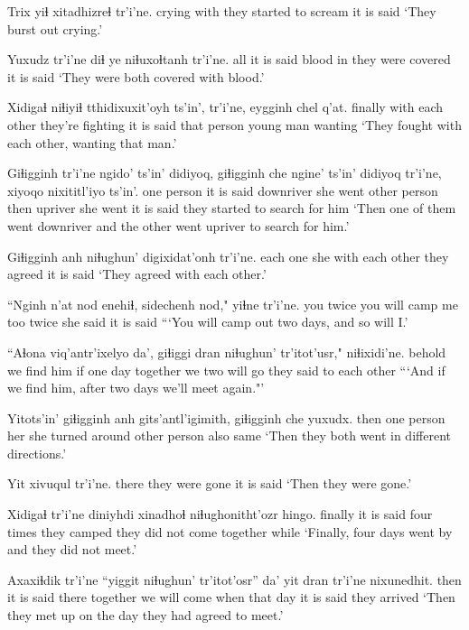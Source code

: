 \documentclass[12pt]{article}
\begin{document}
\gll Trix yiɬ xitadhizreɬ  tr'i'ne.
crying with {they started to scream}  {it is said}
\glt `They burst out crying.'
\glend

\gll Yuxudz tr'i'ne diɬ ye niɬuxoɬtanh  tr'i'ne.
all  {it is said} blood in {they were covered} {it is said}
\glt `They were both covered with blood.'
\glend

\gll Xidigaɬ niɬiyiɬ tthidixuxit'oyh ts'in',  tr'i'ne,  eygginh chel q'at.
finally {with each other} {they're fighting} {}  {it is said} {that person} {young man} wanting
\glt `They fought with each other, wanting that man.'
\glend

\gll Giɬigginh tr'i'ne {ngido' ts'in'} didiyoq, giɬigginh che {ngine' ts'in'} didiyoq tr'i'ne, {xiyoqo nixititl'iyo} ts'in'.
{one person} {it is said} downriver {she went} {other person} then upriver  {she went} {it is said} {they started to search for him}
\glt `Then one of them went downriver and the other went upriver to search for him.'
\glend

\gll Giɬigginh anh niɬughun' digixidat'onh tr'i'ne.
{each one} she {with each other} {they agreed}  {it is said}
\glt `They agreed with each other.'
\glend

\gll ``Nginh n'at nod  enehiɬ, sidechenh nod," yiɬne  tr'i'ne.
you  {} twice {you will camp} {me too} twice {she said} {it is said}
\glt ```You will camp out two days, and so will I.'
\glend

\gll ``Aɬona viq'antr'ixelyo da', giɬiggi dran niɬughun' tr'itot'usr," niɬixidi'ne.
behold  {we find him}  if one  day  together {we two will go} {they said to each other}
\glt ```And if we find him, after two days we'll meet again."'
\glend

\gll Yitots'in' giɬigginh anh gits'antl'igimith, giɬigginh che yuxudx.
then  {one person} her {she turned around} {other person} also same
\glt `Then they both went in different directions.'
\glend

\gll Yit xivuqul  tr'i'ne.
there {they were gone} {it is said}
\glt `Then they were gone.'
\glend

\gll Xidigaɬ tr'i'ne diniyhdi xinadhoɬ niɬughonitht'ozr  hingo.
finally  {it is said} {four times} {they camped} {they did not come together} while
\glt `Finally, four days went by and they did not meet.'
\glend

\gll Axaxiɬdik tr'i'ne ``yiggit niɬughun' tr'itot'osr'' da'  yit dran tr'i'ne nixunedhit.
then  {it is said} there together {we will come} when  that day {it is said} {they arrived}
\glt `Then they met up on the day they had agreed to meet.'
\glend
\end{document}
